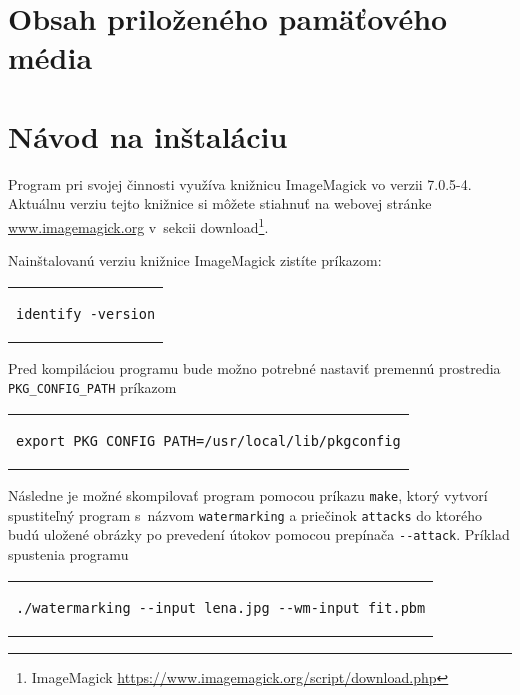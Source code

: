 
\chapter{Obsah priloženého pamäťového média}

\chapter{Návod na inštaláciu}
Program pri svojej činnosti využíva knižnicu ImageMagick vo verzii 7.0.5-4. Aktuálnu verziu tejto knižnice si môžete stiahnuť na webovej stránke \url{www.imagemagick.org} v~sekcii download\footnote{ImageMagick \url{https://www.imagemagick.org/script/download.php}}.

Nainštalovanú verziu knižnice ImageMagick zistíte príkazom:
\begin{center}
\begin{tabular}{c}
\begin{lstlisting}
identify -version
\end{lstlisting}
\end{tabular}
\end{center}

Pred kompiláciou programu bude možno potrebné nastaviť premennú prostredia\\ \verb|PKG_CONFIG_PATH| príkazom
\begin{center}
\begin{tabular}{c}
\begin{lstlisting}
export PKG_CONFIG_PATH=/usr/local/lib/pkgconfig
\end{lstlisting}
\end{tabular}
\end{center}

Následne je možné skompilovať program pomocou príkazu {\tt make}, ktorý vytvorí spustiteľný program s~názvom {\tt watermarking} a priečinok {\tt attacks} do ktorého budú uložené obrázky po prevedení útokov pomocou prepínača \verb|--attack|. Príklad spustenia programu
\begin{center}
\begin{tabular}{c}
\begin{lstlisting}
./watermarking --input lena.jpg --wm-input fit.pbm
\end{lstlisting}
\end{tabular}
\end{center}